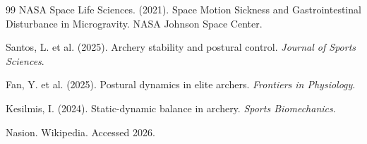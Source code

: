 \documentclass[12pt,a4paper]{article}
\begin{document}
\begin{thebibliography}{99}
NASA Space Life Sciences. (2021). Space Motion Sickness and Gastrointestinal Disturbance in Microgravity. NASA Johnson Space Center.

Santos, L. et al. (2025). Archery stability and postural control. \textit{Journal of Sports Sciences}.

Fan, Y. et al. (2025). Postural dynamics in elite archers. \textit{Frontiers in Physiology}.

Kesilmis, I. (2024). Static-dynamic balance in archery. \textit{Sports Biomechanics}.

Nasion. Wikipedia. Accessed 2026.

\end{thebibliography}
\end{document}
